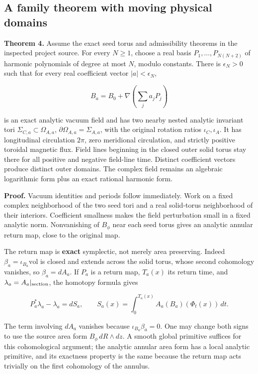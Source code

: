 \subsection{A family theorem with moving physical domains}\label{a-family-theorem-with-moving-physical-domains}

\textbf{Theorem 4.} Assume the exact seed torus and admissibility theorems in the inspected project source. For every \(N\geq1\), choose a real basis \(P_1,\ldots,P_{N(N+2)}\) of harmonic polynomials of degree at most \(N\), modulo constants. There is \(\epsilon_N>0\) such that for every real coefficient vector \(|a|<\epsilon_N\),

\[
B_a=B_0+\nabla\left(\sum_j a_jP_j\right)
\]

is an exact analytic vacuum field and has two nearby nested analytic invariant tori \(\Sigma_{C,a}\subset\Omega_{A,a}\), \(\partial\Omega_{A,a}=\Sigma_{A,a}\), with the original rotation ratios \(\iota_C,\iota_A\). It has longitudinal circulation \(2\pi\), zero meridional circulation, and strictly positive toroidal magnetic flux. Field lines beginning in the closed outer solid torus stay there for all positive and negative field-line time. Distinct coefficient vectors produce distinct outer domains. The complex field remains an algebraic logarithmic form plus an exact rational harmonic form.

\textbf{Proof.} Vacuum identities and periods follow immediately. Work on a fixed complex neighborhood of the two seed tori and a real solid-torus neighborhood of their interiors. Coefficient smallness makes the field perturbation small in a fixed analytic norm. Nonvanishing of \(B_\phi\) near each seed torus gives an analytic annular return map, close to the original map.

The return map is \textbf{exact} symplectic, not merely area preserving. Indeed \(\beta_a=\iota_{B_a}\mathrm{vol}\) is closed and extends across the solid torus, whose second cohomology vanishes, so \(\beta_a=dA_a\). If \(P_a\) is a return map, \(T_a(x)\) its return time, and \(\lambda_a=A_a|_{\rm section}\), the homotopy formula gives

\[
P_a^*\lambda_a-\lambda_a=dS_a,\qquad
S_a(x)=\int_0^{T_a(x)}A_a(B_a)(\Phi_t(x))\,dt.
\]

The term involving \(dA_a\) vanishes because \(\iota_{B_a}\beta_a=0\). One may change both signs to use the source area form \(B_\phi\,dR\wedge dz\). A smooth global primitive suffices for this cohomological argument; the analytic annular area form has a local analytic primitive, and its exactness property is the same because the return map acts trivially on the first cohomology of the annulus.

